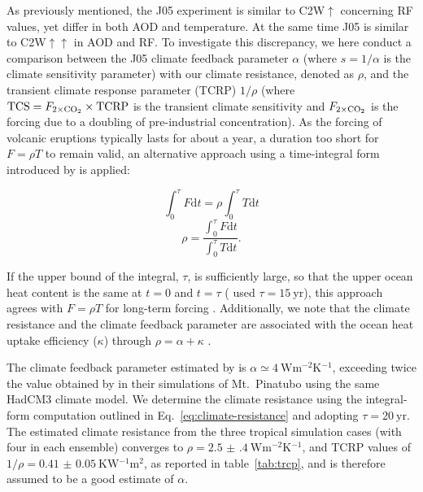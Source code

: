 \documentclass[draft]{agujournal2019}
\begin{document}
As previously mentioned, the J05 experiment is similar to C2W\(\uparrow\) concerning RF
values, yet differ in both AOD and temperature. At the same time J05 is similar to
C2W\(\uparrow\uparrow\) in AOD and RF. To investigate this discrepancy, we here conduct
a comparison between the J05 climate feedback parameter \(\alpha\) (where \(s=1/\alpha\)
is the climate sensitivity parameter) with our climate resistance, denoted as \(\rho\),
and the transient climate response parameter (TCRP) \(1/\rho\) (where
\(\mathrm{TCS}=F_{2\times\ce{CO2}}\times \mathrm{TCRP}\) is the transient climate
sensitivity and \(F_{2\times\ce{CO2}}\) is the forcing due to a doubling of
pre-industrial  concentration). As the forcing of volcanic eruptions typically
lasts for about a year, a duration too short for \(F=\rho T\) to remain valid, an
alternative approach using a time-integral form introduced by  is
applied:

\begin{equation}
  \int_0^{\tau}F \mathrm{d}t=\rho\int_{0}^{\tau}T \mathrm{d}t
  \label{eq:climate-resistance-orig}
\end{equation}
\begin{equation}
  \rho=\frac{\int_0^{\tau}F \mathrm{d}t}{\int_{0}^{\tau}T \mathrm{d}t}.
  \label{eq:climate-resistance}
\end{equation}

If the upper bound of the integral, \(\tau\), is sufficiently large, so that the upper
ocean heat content is the same at \(t=0\) and \(t=\tau\) ( used \(\tau
=\SI{15}{\mathrm{yr}}\)), this approach agrees with \(F=\rho T\) for long-term forcing
\cite{gregory2016}. Additionally, we note that the climate resistance and the climate
feedback parameter are associated with the ocean heat uptake efficiency (\(\kappa\))
through \(\rho =\alpha +\kappa\) \cite{gregory2016}.

The climate feedback parameter estimated by  is \(\alpha \simeq
\SI{4}{\watt\metre^{-2}\kelvin^{-1}}\), exceeding twice the value obtained by
 in their simulations of Mt.\ Pinatubo using the same HadCM3 climate
model. We determine the climate resistance using the integral-form computation outlined
in Eq.~\ref{eq:climate-resistance} and adopting \(\tau =\SI{20}{\mathrm{yr}}\). The
estimated climate resistance from the three tropical simulation cases (with four in each
ensemble) converges to \(\rho =\SI{2.5(4)}{\watt\metre^{-2}\kelvin^{-1}}\), and TCRP
values of \(1/\rho=\SI{0.41(5)}{\kelvin\watt^{-1}\metre^{2}}\), as reported in
table~\ref{tab:trcp}, and is therefore assumed to be a good estimate of \(\alpha\).
\end{document}
